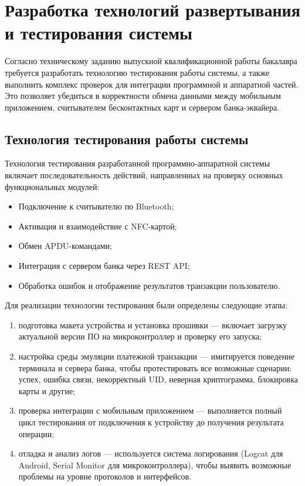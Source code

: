 \newpage

\section{Разработка технологий развертывания и тестирования системы}

Согласно техническому заданию выпускной квалификационной работы бакалавра требуется разработать технологию тестирования работы системы, а также выполнить комплекс проверок для интеграции программной и аппаратной частей.
Это позволяет убедиться в корректности обмена данными между мобильным приложением, считывателем бесконтактных карт и сервером банка-эквайера.

\subsection{Технология тестирования работы системы}
Технология тестирования разработанной программно-аппаратной системы включает последовательность действий, направленных на проверку основных функциональных модулей:

\begin{itemize}
	\item Подключение к считывателю по Bluetooth;
	\item Активация и взаимодействие с NFC-картой;
	\item Обмен APDU-командами;
	\item Интеграция с сервером банка через REST API;
	\item Обработка ошибок и отображение результатов транзакции пользователю.
\end{itemize}

Для реализации технологии тестирования были определены следующие этапы:

\begin{enumerate}
	\item подготовка макета устройства и установка прошивки — включает загрузку актуальной версии ПО на микроконтроллер и проверку его запуска;
	\item настройка среды эмуляции платежной транзакции — имитируется поведение терминала и сервера банка, чтобы протестировать все возможные сценарии: успех, ошибка связи, некорректный UID, неверная криптограмма, блокировка карты и другие;
	\item проверка интеграции с мобильным приложением — выполняется полный цикл тестирования от подключения к устройству до получения результата операции;
	\item отладка и анализ логов — используется система логирования (Logcat для Android, Serial Monitor для микроконтроллера), чтобы выявить возможные проблемы на уровне протоколов и интерфейсов.
\end{enumerate}

